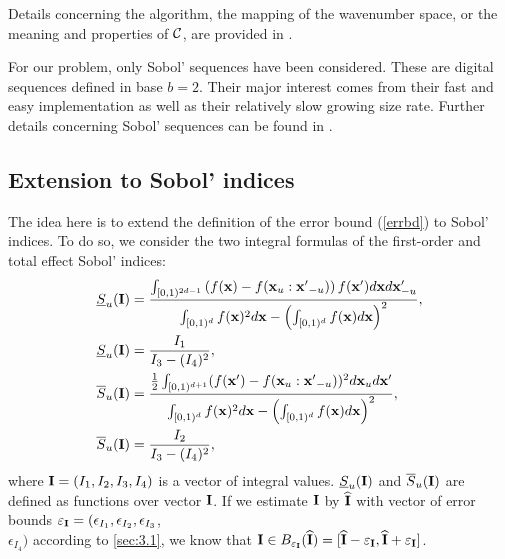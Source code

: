 Details concerning the algorithm, the mapping of the wavenumber space, or the meaning and properties of $\mathcal{C}$, are provided in \cite{HicJim}. 

For our problem, only Sobol' sequences \cite{Sobol'seq} have been considered. These are digital sequences defined in base $b=2$. Their major interest comes from their fast and easy implementation as well as their relatively slow growing size rate. Further details concerning Sobol' sequences can be found in \cite{Lemieuxbook,Niederreiter}.

\subsection{Extension to Sobol' indices}
\label{sec:3.2}
The idea here is to extend the definition of the error bound (\ref{errbd}) to Sobol' indices. To do so, we consider the two integral formulas of the first-order and total effect Sobol' indices:
\begin{align*}
\underline{S}_u(\boldsymbol{\mathbf{I}}) & = \frac{\int_{[0,1)^{2d-1}} \left(f(\boldsymbol{\mathbf{x}})-
f(\boldsymbol{\mathbf{x}}_u:{\boldsymbol{\mathbf{x}}'}_{-u})\right)f(\boldsymbol{\mathbf{x}}')d\boldsymbol{\mathbf{x}} d{\boldsymbol{\mathbf{x}}'_{-u}}}{\int_{[0,1)^{d}} f(\boldsymbol{\mathbf{x}})^2 d{\boldsymbol{\mathbf{x}}}-\left(\int_{[0,1)^{d}} f(\boldsymbol{\mathbf{x}}) d{\boldsymbol{\mathbf{x}}}\right)^2}, \\ 
\underline{S}_u(\boldsymbol{\mathbf{I}}) & = \frac{I_1}{I_3-(I_4)^2}, \\
\overline{S}_u(\boldsymbol{\mathbf{I}}) & = \frac{\frac{1}{2}\int_{[0,1)^{d+1}}(f(\boldsymbol{\mathbf{x}}')-f(\boldsymbol{\mathbf{x}}_u:{\boldsymbol{\mathbf{x}}'}_{-u}))^2d\boldsymbol{\mathbf{x}}_u d{\boldsymbol{\mathbf{x}}'}}{\int_{[0,1)^{d}} f(\boldsymbol{\mathbf{x}})^2 d{\boldsymbol{\mathbf{x}}}-\left(\int_{[0,1)^{d}} f(\boldsymbol{\mathbf{x}}) d{\boldsymbol{\mathbf{x}}}\right)^2}, \\
\overline{S}_u(\boldsymbol{\mathbf{I}}) & = \frac{I_2}{I_3-(I_4)^2},
\end{align*}
where $\boldsymbol{\mathbf{I}}=(I_1,I_2,I_3,I_4)$ is a vector of integral values. $\underline{S}_u(\boldsymbol{\mathbf{I}})$ and $\overline{S}_u(\boldsymbol{\mathbf{I}})$ are defined as functions over vector $\boldsymbol{\mathbf{I}}$. If we estimate $\boldsymbol{\mathbf{I}}$ by $\widehat{\boldsymbol{\mathbf{I}}}$ with vector of error bounds $\varepsilon_{\boldsymbol{\mathbf{I}}}=(\epsilon_{I_1},\epsilon_{I_2},\epsilon_{I_3}$,\\ $\epsilon_{I_4})$ according to \ref{sec:3.1}, we know that $\boldsymbol{\mathbf{I}}\in B_{\varepsilon_{\boldsymbol{\mathbf{I}}}}(\widehat{\boldsymbol{\mathbf{I}}})=[\widehat{\boldsymbol{\mathbf{I}}}-\varepsilon_{\boldsymbol{\mathbf{I}}},\widehat{\boldsymbol{\mathbf{I}}}+\varepsilon_{\boldsymbol{\mathbf{I}}} ]$. 

